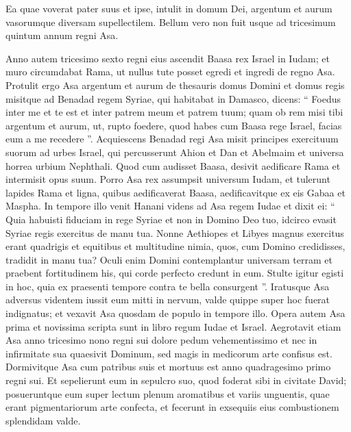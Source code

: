 \begin{biblechapter}
\begin{biblechapter}
\begin{biblechapter}
\begin{biblechapter}
\begin{biblechapter}
\begin{biblechapter}
\begin{biblechapter}
\begin{biblechapter}
\begin{biblechapter}
\begin{biblechapter}
\begin{biblechapter}
\begin{biblechapter}
\begin{biblechapter}
\begin{biblechapter}
\begin{biblechapter}
\verse Ea quae voverat pater suus et ipse, intulit in domum Dei, argentum et aurum vasorumque diversam supellectilem. 
 \verse Bellum vero non fuit usque ad tricesimum quintum annum regni Asa.
 
\begin{biblechapter}
\verse Anno autem tricesimo sexto regni eius ascendit Baasa rex Israel in Iudam; et muro circumdabat Rama, ut nullus tute posset egredi et ingredi de regno Asa.
 \verse Protulit ergo Asa argentum et aurum de thesauris domus Domini et domus regis misitque ad Benadad regem Syriae, qui habitabat in Damasco, dicens: 
\verse “ Foedus inter me et te est et inter patrem meum et patrem tuum; quam ob rem misi tibi argentum et aurum, ut, rupto foedere, quod habes cum Baasa rege Israel, facias eum a me recedere ”. 
\verse Acquiescens Benadad regi Asa misit principes exercituum suorum ad urbes Israel, qui percusserunt Ahion et Dan et Abelmaim et universa horrea urbium Nephthali. 
\verse Quod cum audisset Baasa, desivit aedificare Rama et intermisit opus suum. 
\verse Porro Asa rex assumpsit universum Iudam, et tulerunt lapides Rama et ligna, quibus aedificaverat Baasa, aedificavitque ex eis Gabaa et Maspha.
 \verse In tempore illo venit Hanani videns ad Asa regem Iudae et dixit ei: “ Quia habuisti fiduciam in rege Syriae et non in Domino Deo tuo, idcirco evasit Syriae regis exercitus de manu tua. 
\verse Nonne Aethiopes et Libyes magnus exercitus erant quadrigis et equitibus et multitudine nimia, quos, cum Domino credidisses, tradidit in manu tua? 
\verse Oculi enim Domini contemplantur universam terram et praebent fortitudinem his, qui corde perfecto credunt in eum. Stulte igitur egisti in hoc, quia ex praesenti tempore contra te bella consurgent ”. 
\verse Iratusque Asa adversus videntem iussit eum mitti in nervum, valde quippe super hoc fuerat indignatus; et vexavit Asa quosdam de populo in tempore illo.
 \verse Opera autem Asa prima et novissima scripta sunt in libro regum Iudae et Israel.
 \verse Aegrotavit etiam Asa anno tricesimo nono regni sui dolore pedum vehementissimo et nec in infirmitate sua quaesivit Dominum, sed magis in medicorum arte confisus est. 
\verse Dormivitque Asa cum patribus suis et mortuus est anno quadragesimo primo regni sui. 
\verse Et sepelierunt eum in sepulcro suo, quod foderat sibi in civitate David; posueruntque eum super lectum plenum aromatibus et variis unguentis, quae erant pigmentariorum arte confecta, et fecerunt in exsequiis eius combustionem splendidam valde.
 

\end{biblechapter}
\end{biblechapter}
\end{biblechapter}
\end{biblechapter}
\end{biblechapter}
\end{biblechapter}
\end{biblechapter}
\end{biblechapter}
\end{biblechapter}
\end{biblechapter}
\end{biblechapter}
\end{biblechapter}
\end{biblechapter}
\end{biblechapter}
\end{biblechapter}
\end{biblechapter}
